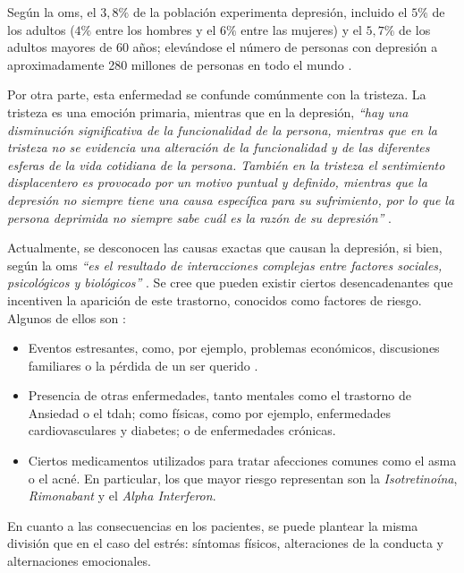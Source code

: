         Según la \gls{oms}, el $3,8\%$ de la población experimenta depresión, incluido el $5\%$ de los adultos ($4\%$ entre los hombres y el $6\%$ entre las mujeres) y el $5,7\%$ de los adultos mayores de $60$ años; elevándose el número de personas con depresión a aproximadamente 280 millones de personas en todo el mundo \cite{oms_depresion_2023}.

        Por otra parte, esta enfermedad se confunde comúnmente con la tristeza. La tristeza es una emoción primaria, mientras que en la depresión, \textit{``hay una disminución significativa de la funcionalidad de la persona, mientras que en la tristeza no se evidencia una alteración de la funcionalidad y de las diferentes esferas de la vida cotidiana de la persona. También en la tristeza el sentimiento displacentero es provocado por un motivo puntual y definido, mientras que la depresión no siempre tiene una causa específica para su sufrimiento, por lo que la persona deprimida no siempre sabe cuál es la razón de su depresión''} \cite{ospina_perez_entendiendo_2018}.

        Actualmente, se desconocen las causas exactas que causan la depresión, si bien, según la \gls{oms} \textit{``es el resultado de interacciones complejas entre factores sociales, psicológicos y biológicos''} \cite{oms_depresion_2023}. Se cree que pueden existir ciertos desencadenantes que incentiven la aparición de este trastorno, conocidos como factores de riesgo. Algunos de ellos son \cite{karamchandani_batra_sistema_2021}:

        \begin{itemize}
            \item Eventos estresantes, como, por ejemplo, problemas económicos, discusiones familiares o la pérdida de un ser querido \cite{tennant_life_2002}.
            \item Presencia de otras enfermedades, tanto mentales como el trastorno de Ansiedad o el \gls{tdah}; como físicas, como por ejemplo, enfermedades cardiovasculares y diabetes; o de enfermedades crónicas. 
            \item Ciertos medicamentos utilizados para tratar afecciones comunes como el asma o el acné. En particular, los que mayor riesgo representan son la \textit{Isotretinoína}, \textit{Rimonabant} y el \textit{Alpha Interferon}.
        \end{itemize}

        En cuanto a las consecuencias en los pacientes, se puede plantear la misma división que en el caso del estrés:  síntomas físicos, alteraciones de la conducta y alternaciones emocionales.
        
